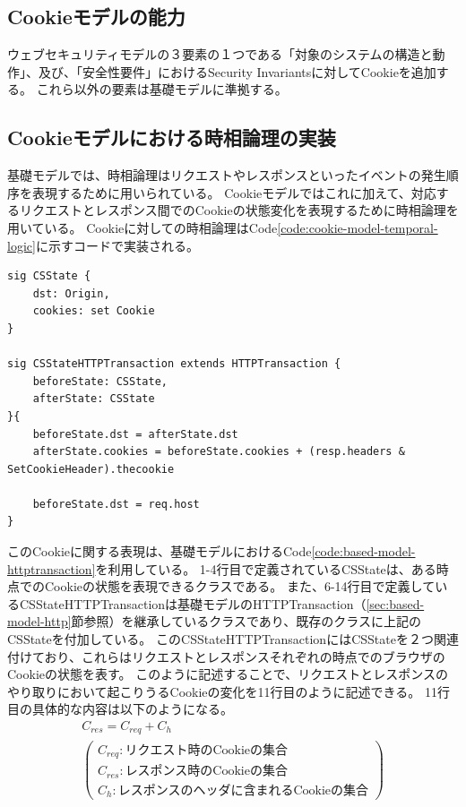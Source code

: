 \documentclass[12pt,a4paper]{jbook}
\begin{document}
\subsection{Cookieモデルの能力}
ウェブセキュリティモデルの３要素の１つである「対象のシステムの構造と動作」、及び、「安全性要件」におけるSecurity Invariantsに対してCookieを追加する。
これら以外の要素は基礎モデル\cite{based-model}に準拠する。

\subsection{Cookieモデルにおける時相論理の実装}
基礎モデルでは、時相論理はリクエストやレスポンスといったイベントの発生順序を表現するために用いられている。
Cookieモデルではこれに加えて、対応するリクエストとレスポンス間でのCookieの状態変化を表現するために時相論理を用いている。
Cookieに対しての時相論理はCode\ref{code:cookie-model-temporal-logic}に示すコードで実装される。
\begin{lstlisting}[caption=Cookieに対する時相論理, label=code:cookie-model-temporal-logic]
sig CSState {
	dst: Origin,
	cookies: set Cookie
}

sig CSStateHTTPTransaction extends HTTPTransaction {
	beforeState: CSState,
	afterState: CSState
}{
	beforeState.dst = afterState.dst
	afterState.cookies = beforeState.cookies + (resp.headers & SetCookieHeader).thecookie
	
	beforeState.dst = req.host
}
\end{lstlisting}
このCookieに関する表現は、基礎モデルにおけるCode\ref{code:based-model-httptransaction}を利用している。
1-4行目で定義されているCSStateは、ある時点でのCookieの状態を表現できるクラスである。
また、6-14行目で定義しているCSStateHTTPTransactionは基礎モデルのHTTPTransaction（\ref{sec:based-model-http}節参照）を継承しているクラスであり、既存のクラスに上記のCSStateを付加している。
このCSStateHTTPTransactionにはCSStateを２つ関連付けており、これらはリクエストとレスポンスそれぞれの時点でのブラウザのCookieの状態を表す。
このように記述することで、リクエストとレスポンスのやり取りにおいて起こりうるCookieの変化を11行目のように記述できる。
11行目の具体的な内容は以下のようになる。
\begin{eqnarray*}
& C_{res} = C_{req} + C_{h} &\\
& \left(
\begin{array}{l}
	C_{req} : \mbox{リクエスト時のCookieの集合}\\
	C_{res} : \mbox{レスポンス時のCookieの集合}\\
	C_{h} : \mbox{レスポンスのヘッダに含まれるCookieの集合}
\end{array}
\right) &
\end{eqnarray*}
\end{document}

